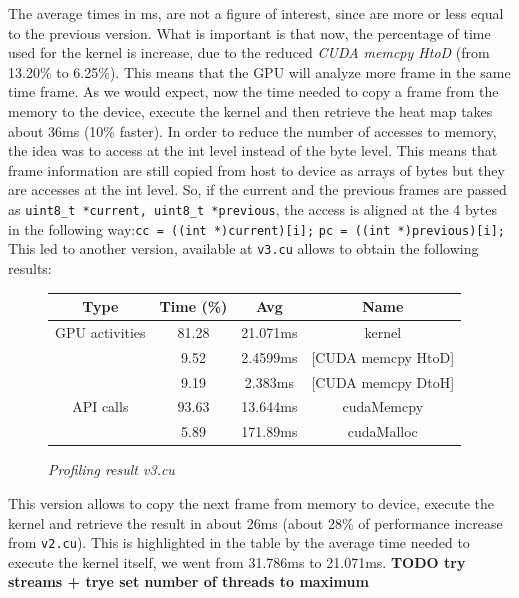 \documentclass[paper=a4, fontsize=10pt]{scrartcl}	%
\begin{document}
	The average times in ms, are not a figure of interest, since are more or less equal to the previous version. What is important is that now, the percentage of time used for the kernel is increase, due to the reduced \textit{CUDA memcpy HtoD} (from 13.20\% to 6.25\%). This means that the GPU will analyze more frame in the same time frame. As we would expect, now the time needed to copy a frame from the memory to the device, execute the kernel and then retrieve the heat map takes about 36ms (10\% faster).\newline\newline
	In order to reduce the number of accesses to memory, the idea was to access at the int level instead of the byte level. This means that frame information are still copied from host to device as arrays of bytes but they are accesses at the int level. So, if the current and the previous frames are passed as \texttt{uint8\_t *current, uint8\_t *previous}, the access is aligned at the 4 bytes in the following way:\newline\newline		\texttt{cc = ((int *)current)[i];}\newline
	\texttt{pc = ((int *)previous)[i];}\newline\newline
	This led to another version, available at \texttt{v3.cu} allows to obtain the following results:
	\begin{figure}[H]
		\centering
		\begin{center}
			\begin{tabular}{ |c|c|c|c| } 
				\hline
				\textbf{Type} & \textbf{Time} (\%) & \textbf{Avg} & \textbf{Name} \\ 
				\hline
				GPU activities & 81.28 & 21.071ms & kernel \\ 
				& 9.52 & 2.4599ms & [CUDA memcpy HtoD] \\ 
				& 9.19 & 2.383ms & [CUDA memcpy DtoH] \\ 
				\hline
				API calls & 93.63 & 13.644ms & cudaMemcpy \\ 
				& 5.89 & 171.89ms & cudaMalloc \\ 
				\hline
			\end{tabular}
		\end{center}
		\label{fig:table_v3}
		\caption{\textit{Profiling result v3.cu}}
	\end{figure}
	
	This version allows to copy the next frame from memory to device, execute the kernel and retrieve the result in about 26ms (about 28\% of performance increase from \texttt{v2.cu}). This is highlighted in the table by the average time needed to execute the kernel itself, we went from 31.786ms to 21.071ms.\newline\newline
	\textbf{TODO try streams + trye set number of threads to maximum}
	
\end{document}
